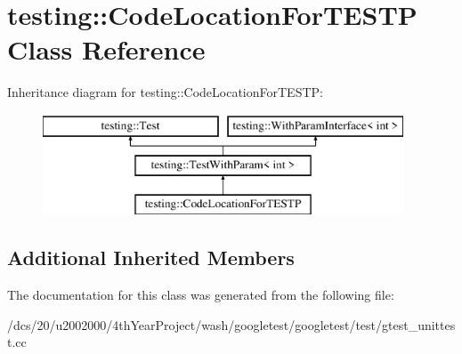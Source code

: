 \hypertarget{classtesting_1_1CodeLocationForTESTP}{}\section{testing\+:\+:Code\+Location\+For\+T\+E\+S\+TP Class Reference}
\label{classtesting_1_1CodeLocationForTESTP}
Inheritance diagram for testing\+:\+:Code\+Location\+For\+T\+E\+S\+TP\+:\begin{figure}[H]
\begin{center}
\leavevmode
\includegraphics[height=3.000000cm]{classtesting_1_1CodeLocationForTESTP}
\end{center}
\end{figure}
\subsection*{Additional Inherited Members}


The documentation for this class was generated from the following file\+:\begin{DoxyCompactItemize}
\item 
/dcs/20/u2002000/4th\+Year\+Project/wash/googletest/googletest/test/gtest\+\_\+unittest.\+cc\end{DoxyCompactItemize}
